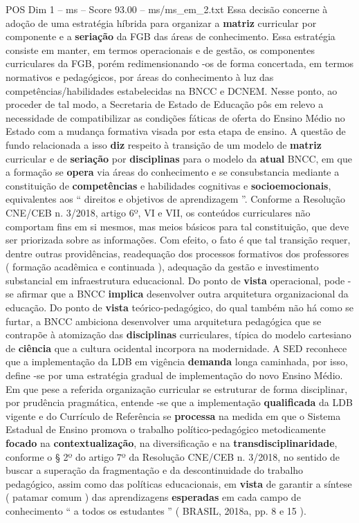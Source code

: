 \begin{textsample}{POS Dim 1 – ms – Score 93.00 – ms/ms\_em\_2.txt}
Essa decisão concerne à adoção de uma estratégia híbrida para organizar a \textbf{matriz} curricular por componente e a \textbf{seriação} da FGB das áreas de conhecimento.
Essa estratégia consiste em manter, em termos operacionais e de gestão, os componentes curriculares da FGB, porém redimensionando -os de forma concertada, em termos normativos e pedagógicos, por áreas do conhecimento à luz das competências/habilidades estabelecidas na BNCC e DCNEM.
Nesse ponto, ao proceder de tal modo, a Secretaria de Estado de Educação pôs em relevo a necessidade de compatibilizar as condições fáticas de oferta do Ensino Médio no Estado com a mudança formativa visada por esta etapa de ensino.
A questão de fundo relacionada a isso \textbf{diz} respeito à transição de um modelo de \textbf{matriz} curricular e de \textbf{seriação} por \textbf{disciplinas} para o modelo da \textbf{atual} BNCC, em que a formação se \textbf{opera} via áreas do conhecimento e se consubstancia mediante a constituição de \textbf{competências} e habilidades cognitivas e \textbf{socioemocionais}, equivalentes aos “ direitos e objetivos de aprendizagem ”.
Conforme a Resolução CNE/CEB n. 3/2018, artigo 6º, VI e VII, os conteúdos curriculares não comportam fins em si mesmos, mas meios básicos para tal constituição, que deve ser priorizada sobre as informações.
Com efeito, o fato é que tal transição requer, dentre outras providências, readequação dos processos formativos dos professores ( formação acadêmica e continuada ), adequação da gestão e investimento substancial em infraestrutura educacional.
Do ponto de \textbf{vista} operacional, pode -se afirmar que a BNCC \textbf{implica} desenvolver outra arquitetura organizacional da educação.
Do ponto de \textbf{vista} teórico-pedagógico, do qual também não há como se furtar, a BNCC ambiciona desenvolver uma arquitetura pedagógica que se contrapõe à atomização das \textbf{disciplinas} curriculares, típica do modelo cartesiano de \textbf{ciência} que a cultura ocidental incorpora na modernidade.
A SED reconhece que a implementação da LDB em vigência \textbf{demanda} longa caminhada, por isso, define -se por uma estratégia gradual de implementação do novo Ensino Médio.
Em que pese a referida organização curricular se estruturar de forma disciplinar, por prudência pragmática, entende -se que a implementação \textbf{qualificada} da LDB vigente e do Currículo de Referência se \textbf{processa} na medida em que o Sistema Estadual de Ensino promova o trabalho político-pedagógico metodicamente \textbf{focado} na \textbf{contextualização}, na diversificação e na \textbf{transdisciplinaridade}, conforme o § 2º do artigo 7º da Resolução CNE/CEB n. 3/2018, no sentido de buscar a superação da fragmentação e da descontinuidade do trabalho pedagógico, assim como das políticas educacionais, em \textbf{vista} de garantir a síntese ( patamar comum ) das aprendizagens \textbf{esperadas} em cada campo de conhecimento “ a todos os estudantes ” ( BRASIL, 2018a, pp. 8 e 15 ).


\end{textsample}
